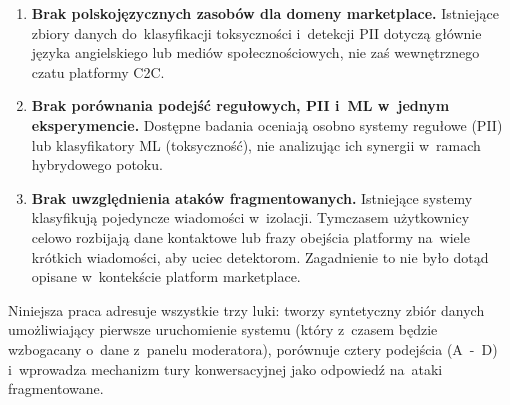 \begin{enumerate}
  \item \textbf{Brak polskojęzycznych zasobów dla domeny marketplace.}
    Istniejące zbiory danych do~klasyfikacji toksyczności i~detekcji PII
    dotyczą głównie języka angielskiego lub mediów społecznościowych,
    nie zaś wewnętrznego czatu platformy C2C.

  \item \textbf{Brak porównania podejść regułowych, PII i~ML w~jednym eksperymencie.}
    Dostępne badania oceniają osobno systemy regułowe (PII) lub klasyfikatory
    ML (toksyczność), nie analizując ich synergii w~ramach hybrydowego potoku.

  \item \textbf{Brak uwzględnienia ataków fragmentowanych.}
    Istniejące systemy klasyfikują pojedyncze wiadomości w~izolacji.
    Tymczasem użytkownicy celowo rozbijają dane kontaktowe lub frazy
    obejścia platformy na~wiele krótkich wiadomości, aby uciec detektorom.
    Zagadnienie to nie było dotąd opisane w~kontekście platform marketplace.
\end{enumerate}

Niniejsza praca adresuje wszystkie trzy luki: tworzy syntetyczny zbiór
danych umożliwiający pierwsze uruchomienie systemu (który z~czasem będzie
wzbogacany o~dane z~panelu moderatora), porównuje cztery podejścia (A~-~D)
i~wprowadza mechanizm tury konwersacyjnej jako odpowiedź na~ataki
fragmentowane.
